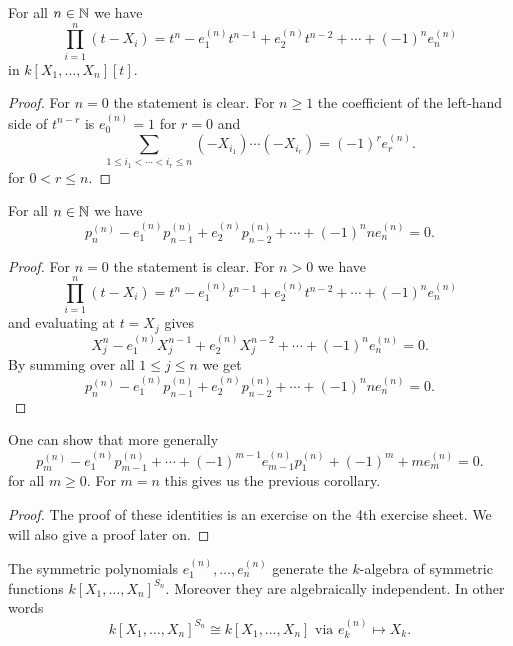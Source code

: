 \begin{lem}
 For all $n \in \mathbb{N}$ we have
 \[
  \prod_{i=1}^n (t-X_i) = t^n - e^{(n)}_1 t^{n-1} + e^{(n)}_2 t^{n-2} + \dotsb + (-1)^n e^{(n)}_n
 \]
 in $k[X_1, \dotsc, X_n][t]$.
\end{lem}
\begin{proof}
 For $n = 0$ the statement is clear. For $n \geq 1$ the coefficient of the left-hand side of $t^{n-r}$ is $e^{(n)}_0 = 1$ for $r = 0$ and
 \[
  \sum_{1 \leq i_1 < \dotsb < i_r \leq n} (-X_{i_1}) \dotsm (-X_{i_r}) = (-1)^r e^{(n)}_r.
 \]
 for $0 < r \leq n$.
\end{proof}


\begin{cor}
 For all $n \in \mathbb{N}$ we have
 \[
  p^{(n)}_n - e^{(n)}_1 p^{(n)}_{n-1} + e^{(n)}_2 p^{(n)}_{n-2} + \dotsb + (-1)^n n e^{(n)}_n = 0.
 \]
\end{cor}
\begin{proof}
 For $n = 0$ the statement is clear. For $n > 0$ we have
 \[
  \prod_{i=1}^n (t-X_i) = t^n - e^{(n)}_1 t^{n-1} + e^{(n)}_2 t^{n-2} + \dotsb + (-1)^n e^{(n)}_n
 \]
 and evaluating at $t = X_j$ gives
 \[
  X_j^n - e^{(n)}_1 X_j^{n-1} + e^{(n)}_2 X_j^{n-2} + \dotsb + (-1)^n e^{(n)}_n = 0.
 \]
 By summing over all $1 \leq j \leq n$ we get
 \[
  p^{(n)}_n - e^{(n)}_1 p^{(n)}_{n-1} + e^{(n)}_2 p^{(n)}_{n-2} + \dotsb + (-1)^n n e^{(n)}_n = 0.
 \]
\end{proof}


\begin{rem}
 One can show that more generally
 \[
  p^{(n)}_m - e^{(n)}_1 p^{(n)}_{m-1} + \dotsb + (-1)^{m-1} e^{(n)}_{m-1} p^{(n)}_1 + (-1)^m+ m e^{(n)}_m = 0.
 \]
 for all $m \geq 0$. For $m = n$ this gives us the previous corollary.
\end{rem}
\begin{proof}
 The proof of these identities is an exercise on the 4th exercise sheet. We will also give a proof later on.
\end{proof}


\begin{thrm}
 The symmetric polynomials $e^{(n)}_1, \dotsc, e^{(n)}_n$ generate the $k$-algebra of symmetric functions $k[X_1, \dotsc, X_n]^{S_n}$. Moreover they are algebraically independent. In other words
 \[
  k[X_1, \dotsc, X_n]^{S_n} \cong k[X_1, \dotsc, X_n] \text{ via } e^{(n)}_k \mapsto X_k.
 \]
\end{thrm}


